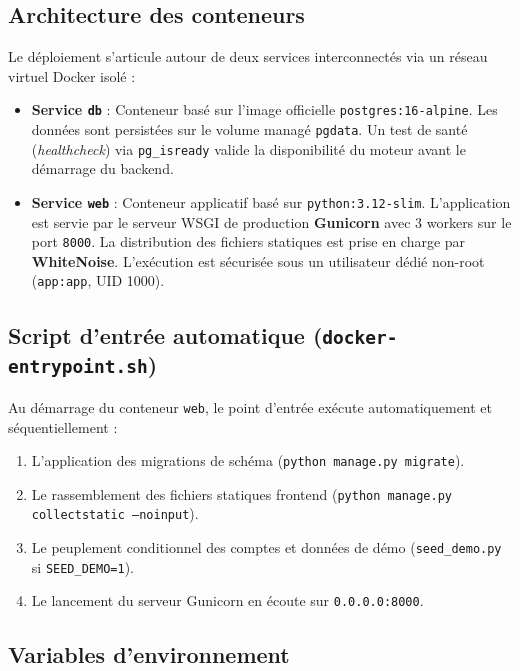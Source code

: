 \documentclass[12pt,a4paper]{report}
\begin{document}
\subsection{Architecture des conteneurs}

Le déploiement s'articule autour de deux services interconnectés via un réseau virtuel Docker isolé :

\begin{itemize}[leftmargin=*]
  \item \textbf{Service \texttt{db}} : Conteneur basé sur l'image officielle \texttt{postgres:16-alpine}. Les données sont persistées sur le volume managé \texttt{pgdata}. Un test de santé (\textit{healthcheck}) via \texttt{pg\_isready} valide la disponibilité du moteur avant le démarrage du backend.
  \item \textbf{Service \texttt{web}} : Conteneur applicatif basé sur \texttt{python:3.12-slim}. L'application est servie par le serveur WSGI de production \textbf{Gunicorn} avec 3 workers sur le port \texttt{8000}. La distribution des fichiers statiques est prise en charge par \textbf{WhiteNoise}. L'exécution est sécurisée sous un utilisateur dédié non-root (\texttt{app:app}, UID 1000).
\end{itemize}

\subsection{Script d'entrée automatique (\texttt{docker-entrypoint.sh})}

Au démarrage du conteneur \texttt{web}, le point d'entrée exécute automatiquement et séquentiellement :
\begin{enumerate}[leftmargin=*]
  \item L'application des migrations de schéma (\texttt{python manage.py migrate}).
  \item Le rassemblement des fichiers statiques frontend (\texttt{python manage.py collectstatic --noinput}).
  \item Le peuplement conditionnel des comptes et données de démo (\texttt{seed\_demo.py} si \texttt{SEED\_DEMO=1}).
  \item Le lancement du serveur Gunicorn en écoute sur \texttt{0.0.0.0:8000}.
\end{enumerate}

\subsection{Variables d'environnement}
\end{document}
